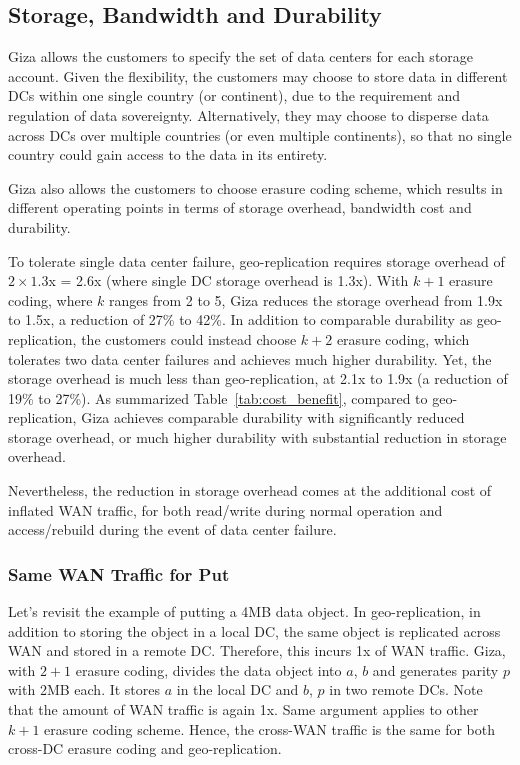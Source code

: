 \subsection{Storage, Bandwidth and Durability}

Giza allows the customers to specify the set of data centers for each storage account. Given the flexibility, the customers may choose to store data in different DCs within one single country (or continent), due to the requirement and regulation of data sovereignty. Alternatively, they may choose to disperse data across DCs over multiple countries (or even multiple continents), so that no single country could gain access to the data in its entirety. 

Giza also allows the customers to choose erasure coding scheme, which results in different operating points in terms of storage overhead, bandwidth cost and durability. 

To tolerate single data center failure, geo-replication requires storage overhead of $2\times1.3$x = 2.6x (where single DC storage overhead is 1.3x). With $k+1$ erasure coding, where $k$ ranges from 2 to 5, Giza reduces the storage overhead from 1.9x to 1.5x, a reduction of 27\% to 42\%. In addition to comparable durability as geo-replication, the customers could instead choose $k+2$ erasure coding, which tolerates two data center failures and achieves much higher durability. Yet, the storage overhead is much less than geo-replication, at 2.1x to 1.9x (a reduction of 19\% to 27\%). As summarized Table~\ref{tab:cost_benefit}, compared to geo-replication, Giza achieves comparable durability with significantly reduced storage overhead, or much higher durability with substantial reduction in storage overhead.

Nevertheless, the reduction in storage overhead comes at the additional cost of inflated WAN traffic, for both read/write during normal operation and access/rebuild during the event of data center failure. 

\subsubsection{Same WAN Traffic for Put}

Let's revisit the example of putting a 4MB data object. In geo-replication, in addition to storing the object in a local DC, the same object is replicated across WAN and stored in a remote DC. Therefore, this incurs 1x of WAN traffic. Giza, with $2 + 1$ erasure coding, divides the data object into $a$, $b$ and generates parity $p$ with 2MB each. It stores $a$ in the local DC and $b$, $p$ in two remote DCs. Note that the amount of WAN traffic is again 1x. Same argument applies to other $k+1$ erasure coding scheme. Hence, the cross-WAN traffic is the same for both cross-DC erasure coding and geo-replication.

